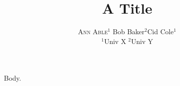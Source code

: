 \documentclass{article}
\begin{document}
\title{A Title}
\author{\begin{minipage}[t]{\textwidth}
\centering \textsc{Ann Able}$^{1}$ \quad Bob Baker$^{2}$\footnotemark[1] \quad Cid Cole$^{1}$\footnotemark[1]\\[0.6em]
$^{1}$Univ X \quad$^{2}$Univ Y
\end{minipage}}
\maketitle
{}
\small
Body.
\end{document}
